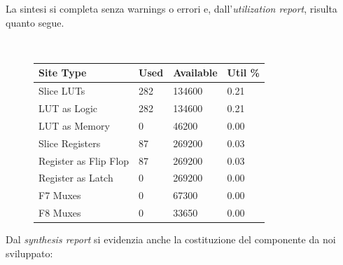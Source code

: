 \documentclass[11pt]{article}
\begin{document}
    La sintesi si completa senza warnings o errori e, dall'\emph{utilization report}, risulta quanto segue.
    
    \begin{figure}[h]
        \centering
        \tt
        \begin{tabular}{|l|l|l|l|}
            \hline
            Site Type & Used & Available & Util \% \\
            \hline
            Slice LUTs & 282 & 134600 & 0.21 \\
            \quad LUT as Logic & 282 & 134600 & 0.21 \\
            \quad LUT as Memory & 0 & 46200 & 0.00 \\
            Slice Registers & 87 & 269200 & 0.03 \\
            \quad Register as Flip Flop & 87 & 269200 & 0.03 \\
            \quad Register as Latch & 0 & 269200 & 0.00 \\
            F7 Muxes & 0 & 67300 & 0.00 \\
            F8 Muxes & 0 & 33650 & 0.00 \\
            \hline
        \end{tabular}
    \end{figure}
    Dal \emph{synthesis report} si evidenzia anche la costituzione del componente da noi sviluppato:
\end{document}
